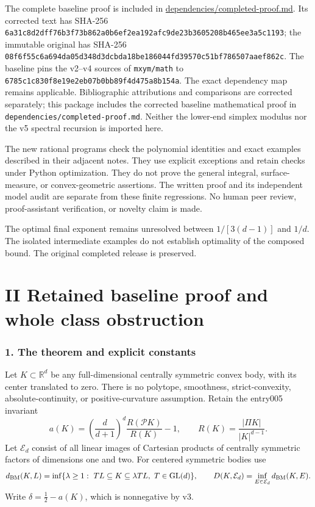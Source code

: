 \documentclass[
  11pt,
]{article}
\begin{document}
The complete baseline proof is included in
\url{dependencies/completed-proof.md}. Its corrected text has SHA-256
\nolinkurl{6a31c8d2dff76b3f73b862a0b6ef2ea192afc9de23b3605208b465ee3a5c1193};
the immutable original has SHA-256
\nolinkurl{08f6f55c6a694da05d348d3dcbda18be186044fd39570c51bf786507aaef862c}.
The baseline pins the v2--v4 sources of \texttt{mxym/math} to
\nolinkurl{6785c1c830f8e19e2eb07b0bb89f4d475a8b154a}. The exact dependency
map remains applicable. Bibliographic attributions and comparisons are
corrected separately; this package includes the corrected baseline
mathematical proof in \texttt{dependencies/completed-proof.md}. Neither
the lower-end simplex modulus nor the v5 spectral recursion is imported
here.

The new rational programs check the polynomial identities and exact
examples described in their adjacent notes. They use explicit exceptions
and retain checks under Python optimization. They do not prove the
general integral, surface-measure, or convex-geometric assertions. The
written proof and its independent model audit are separate from these
finite regressions. No human peer review, proof-assistant verification,
or novelty claim is made.

The optimal final exponent remains unresolved between \(1/[3(d-1)]\) and
\(1/d\). The isolated intermediate examples do not establish optimality
of the composed bound. The original completed release is preserved.

\newpage

\section{II Retained baseline proof and whole class
obstruction}\label{ii-retained-baseline-proof-and-whole-class-obstruction}

\subsubsection{1. The theorem and explicit
constants}\label{the-theorem-and-explicit-constants}

Let \(K\subset\mathbb R^d\) be any full-dimensional centrally symmetric
convex body, with its center translated to zero. There is no polytope,
smoothness, strict-convexity, absolute-continuity, or positive-curvature
assumption. Retain the entry005 invariant \[
 a(K)=\left(\frac d{d+1}\right)^d\frac{R(\mathcal P K)}{R(K)}-1,
 \qquad R(K)=\frac{|\Pi K|}{|K|^{d-1}}.
\] Let \(\mathcal E_d\) consist of all linear images of Cartesian
products of centrally symmetric factors of dimensions one and two. For
centered symmetric bodies use \[
 d_{\rm BM}(K,L)=\inf\{\lambda\ge1:\ TL\subseteq K\subseteq\lambda TL,
                  \ T\in\mathrm{GL}(d)\},
 \qquad D(K,\mathcal E_d)=\inf_{E\in\mathcal E_d}d_{\rm BM}(K,E).
\] Write \(\delta=\tfrac12-a(K)\), which is nonnegative by v3.
\end{document}

